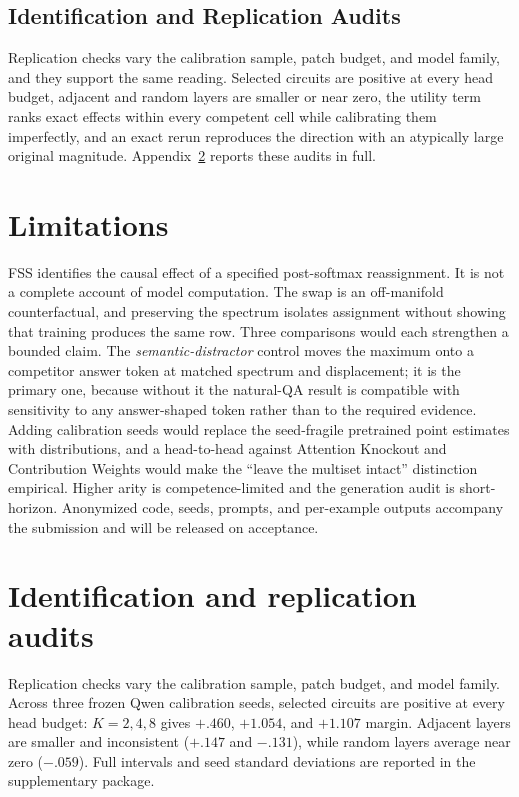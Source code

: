\documentclass{article}
\begin{document}
\subsection{Identification and Replication Audits}

Replication checks vary the calibration sample, patch budget, and model family, and they support the same
reading. Selected circuits are positive at every head budget, adjacent and random layers are smaller or near
zero, the utility term ranks exact effects within every competent cell while calibrating them imperfectly, and
an exact rerun reproduces the direction with an atypically large original magnitude. Appendix~\ref{app:audits}
reports these audits in full.

\section{Limitations}

FSS identifies the causal effect of a specified post-softmax reassignment. It is not a complete account of
model computation. The swap is an off-manifold counterfactual, and preserving the spectrum isolates assignment
without showing that training produces the same row. Three comparisons would each strengthen a bounded claim.
The \emph{semantic-distractor} control moves the maximum onto a competitor answer token at matched spectrum
and displacement; it is the primary one, because without it the natural-QA result is compatible with
sensitivity to any answer-shaped token rather than to the required evidence. Adding calibration seeds would replace the
seed-fragile pretrained point estimates with distributions, and a head-to-head against Attention Knockout and
Contribution Weights would make the ``leave the multiset intact'' distinction empirical. Higher arity is
competence-limited and the generation audit is short-horizon. Anonymized code, seeds, prompts, and per-example
outputs accompany the submission and will be released on acceptance.

{\small


}

\appendix

\section{Identification and replication audits}
\label{app:audits}

Replication checks vary the calibration sample, patch budget, and model family. Across three frozen Qwen
calibration seeds, selected circuits are positive at every head budget: $K=2,4,8$ gives
$+.460$, $+1.054$, and $+1.107$ margin. Adjacent layers are smaller and inconsistent ($+.147$ and
$-.131$), while random layers average near zero ($-.059$). Full intervals and seed standard deviations are
reported in the supplementary package.
\end{document}
